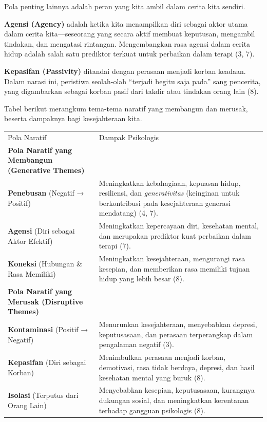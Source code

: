 \documentclass[
  letterpaper,
  DIV=11,
  numbers=noendperiod]{scrreprt}
\begin{document}
Pola penting lainnya adalah peran yang kita ambil dalam cerita kita
sendiri.

\textbf{Agensi (Agency)} adalah ketika kita menampilkan diri sebagai
aktor utama dalam cerita kita---seseorang yang secara aktif membuat
keputusan, mengambil tindakan, dan mengatasi rintangan. Mengembangkan
rasa agensi dalam cerita hidup adalah salah satu prediktor terkuat untuk
perbaikan dalam terapi (3, 7).

\textbf{Kepasifan (Passivity)} ditandai dengan perasaan menjadi korban
keadaan. Dalam narasi ini, peristiwa seolah-olah ``terjadi begitu saja
pada'' sang pencerita, yang digambarkan sebagai korban pasif dari takdir
atau tindakan orang lain (8).

Tabel berikut merangkum tema-tema naratif yang membangun dan merusak,
beserta dampaknya bagi kesejahteraan kita.

\begin{longtable}[]{@{}
  >{\raggedright\arraybackslash}p{}
  >{\raggedright\arraybackslash}p{}@{}}
\toprule\noalign{}
\endhead
\bottomrule\noalign{}
\endlastfoot
Pola Naratif & Dampak Psikologis \\
\textbf{Pola Naratif yang Membangun (Generative Themes)} & \\
\textbf{Penebusan} (Negatif → Positif) & Meningkatkan kebahagiaan,
kepuasan hidup, resiliensi, dan \emph{generativitas} (keinginan untuk
berkontribusi pada kesejahteraan generasi mendatang) (4, 7). \\
\textbf{Agensi} (Diri sebagai Aktor Efektif) & Meningkatkan kepercayaan
diri, kesehatan mental, dan merupakan prediktor kuat perbaikan dalam
terapi (7). \\
\textbf{Koneksi} (Hubungan \& Rasa Memiliki) & Meningkatkan
kesejahteraan, mengurangi rasa kesepian, dan memberikan rasa memiliki
tujuan hidup yang lebih besar (8). \\
\textbf{Pola Naratif yang Merusak (Disruptive Themes)} & \\
\textbf{Kontaminasi} (Positif → Negatif) & Menurunkan kesejahteraan,
menyebabkan depresi, keputusasaan, dan perasaan terperangkap dalam
pengalaman negatif (3). \\
\textbf{Kepasifan} (Diri sebagai Korban) & Menimbulkan perasaan menjadi
korban, demotivasi, rasa tidak berdaya, depresi, dan hasil kesehatan
mental yang buruk (8). \\
\textbf{Isolasi} (Terputus dari Orang Lain) & Menyebabkan kesepian,
keputusasaan, kurangnya dukungan sosial, dan meningkatkan kerentanan
terhadap gangguan psikologis (8). \\
\end{longtable}
\end{document}
